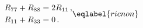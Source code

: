 \begin{equation}
\begin{split}
&R_{77}+R_{88}=2 R_{11}\,,\\
&R_{11}+R_{33}=0\,.
\end{split}
\eqlabel{ricnon}
\end{equation} 
